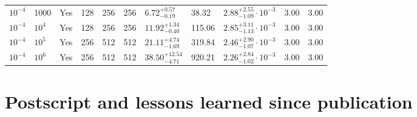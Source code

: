 \begin{table}
\begin{center}
\begin{tabular}{ p{1cm} p{1cm} p{1cm} p{1cm} p{1cm} p{1cm} p{1.75cm} p{1.5cm} p{2.75cm} p{1cm} p{1.2cm}  }
\vspace{0.08cm}$10^{-4}$	&	1000	&	Yes	&	128	&	256	&	256	&$	6.72	_{-	0.19	}^{+	0.57	}$&	38.32	&$	2.88	_{-	1.09	}^{+	2.55}\cdot 10^{-3}	$&	3.00	&	3.00	\\
\vspace{0.08cm}$10^{-4}$	&	$10^4$	&	Yes	&	128	&	256	&	256	&$	11.92	_{-	0.40	}^{+	1.34	}$&	115.06	&$	2.85	_{-	1.13	}^{+	3.11}\cdot 10^{-3}	$&	3.00	&	3.00	\\
\vspace{0.08cm}$10^{-4}$	&	$10^5$	&	Yes	&	256	&	512	&	512	&$	21.11	_{-	1.69	}^{+	4.74	}$&	319.84	&$	2.46	_{-	1.07	}^{+	2.90}\cdot 10^{-3}	$&	3.00	&	3.00	\\
\vspace{0.08cm}$10^{-4}$	&	$10^6$	&	Yes	&	256	&	512	&	512	&$	38.50	_{-	4.71	}^{+	12.54	}$&	920.21	&$	2.26	_{-	1.02	}^{+	2.84}\cdot 10^{-3}	$&	3.00	&	3.00	\\
\hline
\end{tabular}
\end{center}
\end{table}

\section{Postscript and lessons learned since publication}
